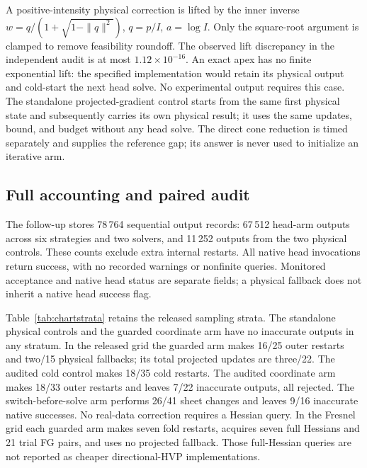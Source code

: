 A positive-intensity physical correction is lifted by the inner inverse $w=q/(1+\sqrt{1-\|q\|^2})$, $q=p/I$, $a=\log I$. Only the square-root argument is clamped to remove feasibility roundoff. The observed lift discrepancy in the independent audit is at most $1.12\times10^{-16}$. An exact apex has no finite exponential lift: the specified implementation would retain its physical output and cold-start the next head solve. No experimental output requires this case. The standalone projected-gradient control starts from the same first physical state and subsequently carries its own physical result; it uses the same updates, bound, and budget without any head solve. The direct cone reduction is timed separately and supplies the reference gap; its answer is never used to initialize an iterative arm.

\subsection{Full accounting and paired audit}
The follow-up stores 78\,764 sequential output records: 67\,512 head-arm outputs across six strategies and two solvers, and 11\,252 outputs from the two physical controls. These counts exclude extra internal restarts. All native head invocations return success, with no recorded warnings or nonfinite queries. Monitored acceptance and native head status are separate fields; a physical fallback does not inherit a native head success flag.

Table~\ref{tab:chartstrata} retains the released sampling strata. The standalone physical controls and the guarded coordinate arm have no inaccurate outputs in any stratum. In the released grid the guarded arm makes 16/25 outer restarts and two/15 physical fallbacks; its total projected updates are three/22. The audited cold control makes 18/35 cold restarts. The audited coordinate arm makes 18/33 outer restarts and leaves 7/22 inaccurate outputs, all rejected. The switch-before-solve arm performs 26/41 sheet changes and leaves 9/16 inaccurate native successes. No real-data correction requires a Hessian query. In the Fresnel grid each guarded arm makes seven fold restarts, acquires seven full Hessians and 21 trial FG pairs, and uses no projected fallback. Those full-Hessian queries are not reported as cheaper directional-HVP implementations.

